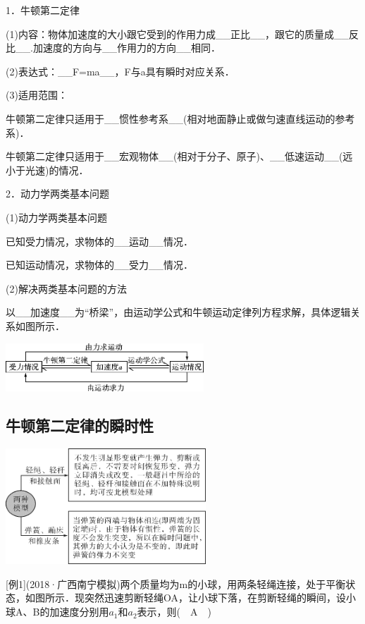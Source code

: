 \documentclass[cn,10.5pt,chinese,mac,chinesefont=founder]{elegantbook}
\begin{document}
1．牛顿第二定律

(1)内容：物体加速度的大小跟它受到的作用力成\_\_正比\_\_，跟它的质量成\_\_反比\_\_.加速度的方向与\_\_作用力的方向\_\_相同．

(2)表达式：\_\_F=ma\_\_，F与a具有瞬时对应关系．

(3)适用范围：

牛顿第二定律只适用于\_\_惯性参考系\_\_(相对地面静止或做匀速直线运动的参考系)．

牛顿第二定律只适用于\_\_宏观物体\_\_(相对于分子、原子)、\_\_低速运动\_\_(远小于光速)的情况．

2．动力学两类基本问题

(1)动力学两类基本问题

已知受力情况，求物体的\_\_运动\_\_情况．

已知运动情况，求物体的\_\_受力\_\_情况．

(2)解决两类基本问题的方法

以\_\_加速度\_\_为``桥梁''，由运动学公式和牛顿运动定律列方程求解，具体逻辑关系如图所示．

\begin{center}\includegraphics[width=2.92708in,height=0.71875in]{media/image99.png}\end{center}

\newpage
\subsection{牛顿第二定律的瞬时性}

\begin{center}\includegraphics[width=2.95833in,height=1.70833in]{media/image100.png}\end{center}

{[}例1{]}(2018·广西南宁模拟)两个质量均为m的小球，用两条轻绳连接，处于平衡状态，如图所示．现突然迅速剪断轻绳OA，让小球下落，在剪断轻绳的瞬间，设小球A、B的加速度分别用$a_1$和$a_2$表示，则(　A　)
\end{document}
